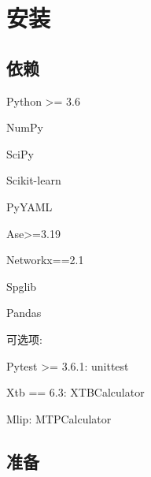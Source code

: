 \documentclass[12pt]{article}
\begin{document}

\newpage
\setcounter{tocdepth}{3}
\tableofcontents

\newpage
\section{安装}

\subsection{依赖}
Python >= 3.6\par
NumPy \par
SciPy \par
Scikit-learn\par
PyYAML\par
Ase>=3.19\par
Networkx==2.1\par
Spglib\par
Pandas\par
可选项:\par
Pytest >= 3.6.1: unittest\par
Xtb == 6.3: XTBCalculator\par
Mlip: MTPCalculator
\subsection{准备}
\end{document}
